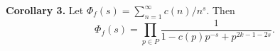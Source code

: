 \textbf{Corollary 3.} Let $\Phi_f(s) = \sum_{n=1}^{\infty} c(n)/n^s$. Then
$$\Phi_f(s) = \prod_{p \in P} \frac{1}{1 - c(p)p^{-s} + p^{2k-1-2s}}.$$
